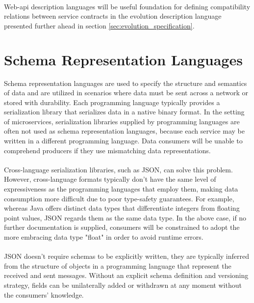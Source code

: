 \paragraph{}

Web-api description languages will be useful foundation for defining compatibility relations between service contracts in the evolution description language
presented further ahead in section \ref{sec:evolution_specification}.

\section{Schema Representation Languages} %
\label{sec:schema_representation_languages}

Schema representation languages are used to specify the structure and semantics of data and are utilized in scenarios where data must be sent across a network or stored with durability.
Each programming language typically provides a serialization library that serializes data in a native binary format.
In the setting of microservices, serialization libraries supplied by programming languages are often not used as schema representation languages,
because each service may be written in a different programming language.
Data consumers will be unable to comprehend producers if they use mismatching data representations.

\paragraph{}

Cross-language serialization libraries, such as JSON, can solve this problem.
However, cross-language formats typically don't have the same level of expressiveness as the programming languages that employ them,
making data consumption more difficult due to poor type-safety guarantees.
For example, whereas Java offers distinct data types that differentiate integers from floating point values, JSON regards them as the same data type.
In the above case, if no further documentation is supplied, consumers will be constrained to adopt the more embracing data type "float" in order to avoid runtime errors.

\paragraph{}

JSON doesn't require schemas to be explicitly written, they are typically inferred from the structure of objects in a programming language that represent the received and sent messages.
Without an explicit schema definition and versioning strategy, fields can be unilaterally added or withdrawn at any moment without the consumers' knowledge.

